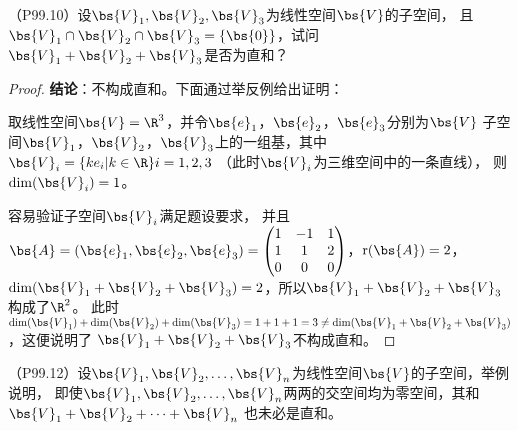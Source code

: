 \documentclass[12pt, a4paper, oneside, UTF8]{ctexbook}
\begin{document}
\begin{question}
    \label{no zhihe}
    （P99.10）设$\bs{V}_1,\bs{V}_2,\bs{V}_3$为线性空间$\bs{V}$的子空间，
    且$\bs{V}_1 \cap \bs{V}_2 \cap \bs{V}_3=\{\bs{0}\}$，试问$\bs{V}_1+\bs{V}_2+\bs{V}_3$是否为直和？    
\end{question}

\begin{proof}
    \textbf{结论}：不构成直和。下面通过举反例给出证明：

    取线性空间$\bs{V}=\R^3$，并令$\bs{e}_1$，$\bs{e}_2$，$\bs{e}_3$分别为$\bs{V}$
    子空间$\bs{V}_1$，$\bs{V}_2$，$\bs{V}_3$上的一组基，其中$\bs{V}_i=\{ke_i|k\in\R\} i=1,2,3$
    （此时$\bs{V}_i$为三维空间中的一条直线），
    则$\mathrm{dim}(\bs{V}_i)=1$。
    
    容易验证子空间$\bs{V}_i$满足题设要求，
    并且$\bs{A}=(\bs{e}_1,\bs{e}_2,\bs{e}_3)=\begin{pmatrix}
        1 & -1 &1 \\
        1 & 1 &2 \\
        0 & 0 & 0
    \end{pmatrix}$，$\mathrm{r}(\bs{A})=2$，$\mathrm{dim}(\bs{V}_1+\bs{V}_2+\bs{V}_3)=2$，所以$\bs{V}_1+\bs{V}_2+\bs{V}_3$构成了$\R^2$。
    此时$\mathrm{dim}(\bs{V}_1)+\mathrm{dim}(\bs{V}_2)+\mathrm{dim}(\bs{V}_3)=1+1+1=3 \neq \mathrm{dim}(\bs{V}_1+\bs{V}_2+\bs{V}_3)$，这便说明了
    $\bs{V}_1+\bs{V}_2+\bs{V}_3$不构成直和。
\end{proof}

\begin{question}
    （P99.12）设$\bs{V}_1,\bs{V}_2,\ldots,\bs{V}_n$为线性空间$\bs{V}$的子空间，举例说明，
    即使$\bs{V}_1,\bs{V}_2,\ldots,\bs{V}_n$两两的交空间均为零空间，其和$\bs{V}_1+\bs{V}_2+\cdots+\bs{V}_n$
    也未必是直和。
\end{question}
\end{document}

